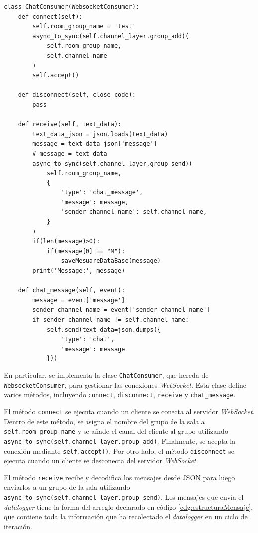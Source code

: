 \begin{lstlisting}[style=pythonstyle, caption={Declaracion de las funciones que utiliza cada consumidor para interactuar con el servidor \textit{WebSocket}.}, label=cdg:consumer,basicstyle=\ttfamily\fontsize{8}{8}\selectfont]
class ChatConsumer(WebsocketConsumer):
    def connect(self):
        self.room_group_name = 'test'
        async_to_sync(self.channel_layer.group_add)(
            self.room_group_name,
            self.channel_name           
        )
        self.accept()

    def disconnect(self, close_code):
        pass
        
    def receive(self, text_data):
        text_data_json = json.loads(text_data)
        message = text_data_json['message']
        # message = text_data
        async_to_sync(self.channel_layer.group_send)(
            self.room_group_name,
            {
                'type': 'chat_message',
                'message': message,
                'sender_channel_name': self.channel_name,
            }
        )
        if(len(message)>0):
            if(message[0] == "M"):
                saveMesuareDataBase(message)
        print('Message:', message)

    def chat_message(self, event):
        message = event['message']
        sender_channel_name = event['sender_channel_name']
        if sender_channel_name != self.channel_name:
            self.send(text_data=json.dumps({
                'type': 'chat',
                'message': message
            }))
\end{lstlisting}

En particular, se implementa la clase \texttt{ChatConsumer}, que hereda de \texttt{WebsocketConsumer}, para gestionar las conexiones \textit{WebSocket}. Esta clase define varios métodos, incluyendo \texttt{connect}, \texttt{disconnect}, \texttt{receive} y \texttt{chat\_message}.

El método \texttt{connect} se ejecuta cuando un cliente se conecta al servidor \textit{WebSocket}. Dentro de este método, se asigna el nombre del grupo de la sala a \texttt{self.room\_group\_name} y se añade el canal del cliente al grupo utilizando \texttt{async\_to\_sync(self.channel\_layer.group\_add)}. Finalmente, se acepta la conexión mediante \texttt{self.accept()}. Por otro lado, el método \texttt{disconnect} se ejecuta cuando un cliente se desconecta del servidor \textit{WebSocket}.

El método \texttt{receive} recibe y decodifica los mensajes desde JSON para luego enviarlos a un grupo de la sala utilizando \texttt{async\_to\_sync(self.channel\_layer.group\_send)}. Los mensajes que envía el \textit{datalogger} tiene la forma del arreglo declarado en código \ref{cdg:estructuraMensaje}, que contiene toda la información que ha recolectado el \textit{datalogger} en un ciclo de iteración.


